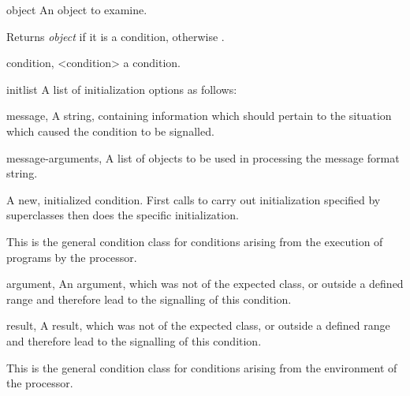 \begin{optDefinition}
%
\begin{arguments}
    \item[object] An object to examine.
\end{arguments}
%
\result%
Returns {\em object\/} if it is a condition, otherwise \nil{}.

%
\begin{specargs}
    \item[condition, <condition>] a condition.
    \item[initlist] A list of initialization options as follows:
    \begin{options}
        \item[message, \classref{string}] A string, containing information which
        should pertain to the situation which caused the condition to be
        signalled.

        \item[message-arguments, \classref{list}] A list of objects to be used
        in processing the message format string.
    \end{options}
\end{specargs}
%
\result%
A new, initialized condition.
%
\remarks%
First calls  to carry out initialization specified
by superclasses then does the  specific initialization.
%

%
This is the general condition class for conditions arising from the
execution of programs by the processor.

%
\begin{initoptions}
    \item[argument, \classref{object}] An argument, which was not of the
    expected class, or outside a defined range and therefore lead to the
    signalling of this condition.
\end{initoptions}

%
\begin{initoptions}
    \item[result, \classref{object}] A result, which was not of the expected
    class, or outside a defined range and therefore lead to the signalling of
    this condition.
\end{initoptions}

%
This is the general condition class for conditions arising from the
environment of the processor.


\end{optDefinition}
